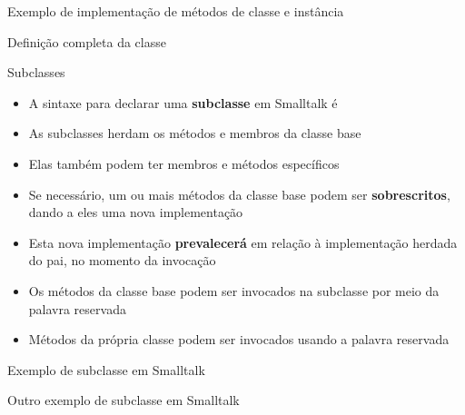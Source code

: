 \begin{frame}[fragile]{Exemplo de implementação de métodos de classe e instância}
\end{frame}

\begin{frame}[fragile]{Definição completa da classe }
\end{frame}

\begin{frame}[fragile]{Subclasses}

    \begin{itemize}
        \item A sintaxe para declarar uma \textbf{subclasse} em Smalltalk é


        \item As subclasses herdam os métodos e membros da classe base

        \item Elas também podem ter membros e métodos específicos

        \item Se necessário, um ou mais métodos da classe base podem ser \textbf{sobrescritos},
            dando a eles uma nova implementação

        \item Esta nova implementação \textbf{prevalecerá} em relação à implementação herdada do 
            pai, no momento da invocação 

        \item Os métodos da classe base podem ser invocados na subclasse por meio da palavra
            reservada 

        \item Métodos da própria classe podem ser invocados usando a palavra reservada
    \end{itemize}

\end{frame}

\begin{frame}[fragile]{Exemplo de subclasse em Smalltalk}
\end{frame}

\begin{frame}[fragile]{Outro exemplo de subclasse em Smalltalk}
\end{frame}


